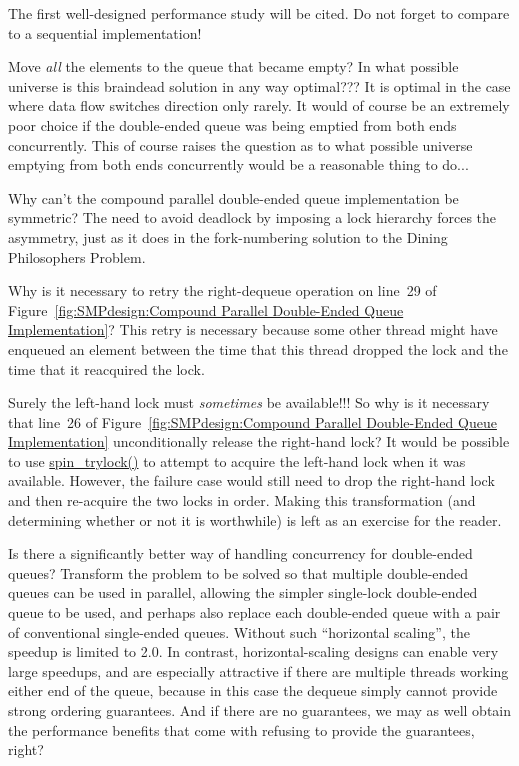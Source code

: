 	The first well-designed performance study will be cited.
	Do not forget to compare to a sequential implementation!

\QuickQ{}
	Move \emph{all} the elements to the queue that became empty?
	In what possible universe is this braindead solution in any
	way optimal???
\QuickA{}
	It is optimal in the case where data flow switches direction only
	rarely.
	It would of course be an extremely poor choice if the double-ended
	queue was being emptied from both ends concurrently.
	This of course raises the question as to what possible universe
	emptying from both ends concurrently would be a reasonable
	thing to do...

\QuickQ{}
	Why can't the compound parallel double-ended queue
	implementation be symmetric?
\QuickA{}
	The need to avoid deadlock by imposing a lock hierarchy
	forces the asymmetry, just as it does in the fork-numbering
	solution to the Dining Philosophers Problem.

\QuickQ{}
	Why is it necessary to retry the right-dequeue operation
	on line~29 of
	Figure~\ref{fig:SMPdesign:Compound Parallel Double-Ended Queue Implementation}?
\QuickA{}
	This retry is necessary because some other thread might have
	enqueued an element between the time that this thread dropped
	the lock and the time that it reacquired the lock.

\QuickQ{}
	Surely the left-hand lock must \emph{sometimes} be available!!!
	So why is it necessary that line~26 of
	Figure~\ref{fig:SMPdesign:Compound Parallel Double-Ended Queue Implementation}
	unconditionally release the right-hand lock?
\QuickA{}
	It would be possible to use \url{spin_trylock()} to attempt
	to acquire the left-hand lock when it was available.
	However, the failure case would still need to drop the
	right-hand lock and then re-acquire the two locks in order.
	Making this transformation (and determining whether or not
	it is worthwhile) is left as an exercise for the reader.

\QuickQ{}
	Is there a significantly better way of handling concurrency
	for double-ended queues?
\QuickA{}
	Transform the problem to be solved so that multiple double-ended
	queues can be used in parallel, allowing the simpler single-lock
	double-ended queue to be used, and perhaps also replace each
	double-ended queue with a pair of conventional single-ended queues.
	Without such ``horizontal scaling'', the speedup is limited
	to 2.0.
	In contrast, horizontal-scaling designs can enable very large
	speedups, and are especially attractive if there are multiple threads
	working either end of the queue, because in this case the dequeue
	simply cannot provide strong ordering guarantees.
	And if there are no guarantees, we may as well obtain the
	performance benefits that come with refusing to provide the
	guarantees, right?

